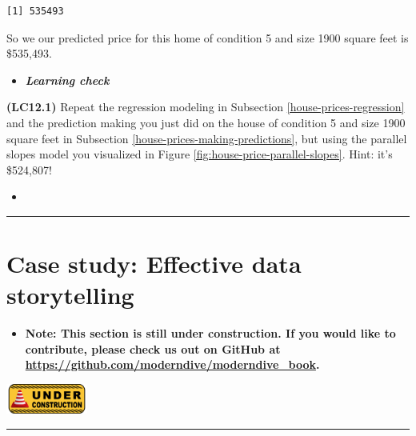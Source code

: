\documentclass[12pt, krantz2,]{krantz}
\newenvironment{rmdblock}[1]
  {\begin{shaded*}
  \begin{itemize}
  \renewcommand{\labelitemi}{
    \raisebox{-.7\height}[0pt][0pt]{
    }
  }
  \item
  }
  {
  \end{itemize}
  \end{shaded*}
  }
\newenvironment{learncheck}
  {\begin{rmdblock}{warning}}
  {\end{rmdblock}}
\begin{document}
\begin{verbatim}
[1] 535493
\end{verbatim}

So we our predicted price for this home of condition 5 and size 1900 square feet is \$535,493.

\begin{learncheck}
\textbf{\emph{Learning check}}
\end{learncheck}

\textbf{(LC12.1)} Repeat the regression modeling in Subsection \ref{house-prices-regression} and the prediction making you just did on the house of condition 5 and size 1900 square feet in Subsection \ref{house-prices-making-predictions}, but using the parallel slopes model you visualized in Figure \ref{fig:house-price-parallel-slopes}. Hint: it's \$524,807!

\begin{learncheck}

\end{learncheck}

\begin{center}\rule{0.5\linewidth}{\linethickness}\end{center}

\hypertarget{data-journalism}{%
\section{Case study: Effective data storytelling}\label{data-journalism}}

\begin{learncheck}
\textbf{Note: This section is still under construction. If you would
like to contribute, please check us out on GitHub at
\url{https://github.com/moderndive/moderndive_book}.}
\end{learncheck}

\includegraphics[width=0.2\textwidth,height=\textheight]{images/sign-2408065_1920.png}

\begin{center}\rule{0.5\linewidth}{\linethickness}\end{center}
\end{document}
